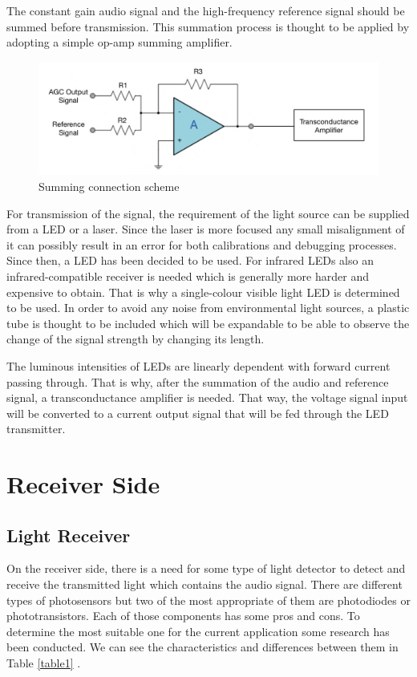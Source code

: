 \documentclass[a4paper,10pt]{IEEEtran}
\begin{document}
The constant gain audio signal and the high-frequency reference signal should be summed before transmission. This summation process is thought to be applied by adopting a simple op-amp summing amplifier. 	
\begin{figure}[htbp!]
    \centering
    \includegraphics[width = 1\linewidth]{transconductance.jpeg}
    \caption{Summing connection scheme }
\end{figure} 
For transmission of the signal, the requirement of the light source can be supplied from a LED or a laser. Since the laser is more focused any small misalignment of it can possibly result in an error for both calibrations and debugging processes. Since then, a LED has been decided to be used. For infrared LEDs also an infrared-compatible receiver is needed which is generally more harder and expensive to obtain. That is why a single-colour visible light LED is determined to be used. In order to avoid any noise from environmental light sources, a plastic tube is thought to be included which will be expandable to be able to observe the change of the signal strength by changing its length. 

The luminous intensities of LEDs are linearly dependent with forward current passing through. That is why, after the summation of the audio and reference signal, a transconductance amplifier is needed. That way, the voltage signal input will be converted to a current output signal that will be fed through the LED transmitter.
\vspace{-0.45cm}
\section{Receiver Side}
\vspace{-0.1cm}
\subsection{Light Receiver}

On the receiver side, there is a need for some type of light detector to detect and receive the transmitted light which contains the audio signal. There are different types of photosensors but two of the most appropriate of them are photodiodes or phototransistors. Each of those components has some pros and cons. To determine the most suitable one for the current application some research has been conducted. We can see the characteristics and differences between them in Table \ref*{table1} . 
\end{document}
